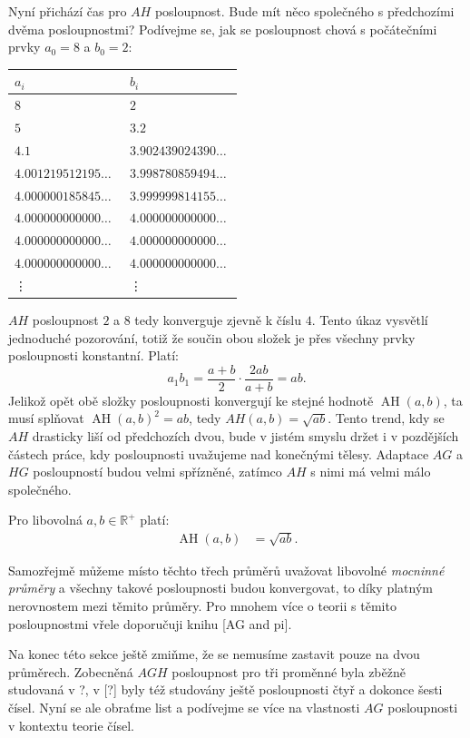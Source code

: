 \documentclass[12pt]{report}
\DeclareMathOperator{\AH}{AH}
\begin{document}
Nyní přichází čas pro $AH$ posloupnost. Bude mít něco společného s předchozími dvěma posloupnostmi? Podívejme se, jak se posloupnost chová s počátečními prvky $a_0 = 8$ a $b_0 = 2$:

\begin{longtable}[H]{>{\raggedright\arraybackslash}p{0.3\linewidth}p{0.202\linewidth}}
\toprule
$a_i$ & $b_i$\\
\midrule
$8$ & \noindent $2$\\
$5$ & \noindent $3.2$\\
$4.1$ & $3.902439024390\dots$\\
$4.001219512195\dots$ & $3.998780859494\dots$\\ 
$4.000000185845\dots$ & $3.999999814155\dots$\\
$4.000000000000\dots$ & $4.000000000000\dots$\\
$4.000000000000\dots$ & $4.000000000000\dots$\\
$4.000000000000\dots$ & $4.000000000000\dots$\\
\vdots & \vdots\\
\bottomrule 
\end{longtable} 

$AH$ posloupnost $2$ a $8$ tedy konverguje zjevně k číslu $4$. Tento úkaz vysvětlí jednoduché pozorování, totiž že součin obou složek je přes všechny prvky posloupnosti konstantní. Platí:
$$a_1  b_1 = \frac{a+b}{2} \cdot \frac{2ab}{a+b} = ab.$$
Jelikož opět obě složky posloupnosti konvergují ke stejné hodnotě $\AH(a,b)$, ta musí splňovat $\AH (a,b)^2 = ab$, tedy $AH(a,b) = \sqrt{ab}$. Tento trend, kdy se $AH$ drasticky liší od předchozích dvou, bude v jistém smyslu držet i v pozdějších částech práce, kdy posloupnosti uvažujeme nad konečnými tělesy. Adaptace $AG$ a $HG$ posloupností budou velmi spřízněné, zatímco $AH$ s nimi má velmi málo společného.

\begin{veta}
Pro libovolná $a,b \in \mathbb{R}^{+}$ platí:
\begin{align*}
\AH(a,b) &= \sqrt{ab}.
\end{align*}
\end{veta}

Samozřejmě můžeme místo těchto třech průměrů uvažovat libovolné \textit{mocninné průměry} a všechny takové posloupnosti budou konvergovat, to díky platným nerovnostem mezi těmito průměry. Pro mnohem více o teorii s těmito posloupnostmi vřele doporučuji knihu [AG and pi].

Na konec této sekce ještě zmiňme, že se nemusíme zastavit pouze na dvou průměrech. Zobecněná $AGH$ posloupnost pro tři proměnné byla zběžně studovaná v ?, v [?] byly též studovány ještě posloupnosti čtyř a dokonce šesti čísel. Nyní se ale obraťme list a podívejme se více na vlastnosti $AG$ posloupnosti v kontextu teorie čísel. 
\end{document}
